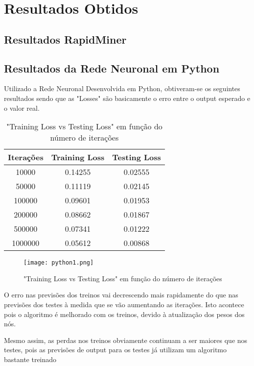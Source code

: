 \documentclass[conference]{IEEEtran}
\begin{document}
\section{Resultados Obtidos}
\subsection{Resultados RapidMiner}


\subsection{Resultados da Rede Neuronal em Python}

Utilizado a Rede Neuronal Desenvolvida em Python, obtiveram-se os seguintes resultados sendo que as "Losses" são basicamente o erro entre o output esperado e o valor real.

\begin{table}[htbp]
\caption{"Training Loss vs Testing Loss" em função do número de iterações}
\begin{center}
\begin{tabular}{|c|c|c|}
\hline
\textbf{Iterações} & \textbf{Training Loss} & \textbf{Testing Loss} \\
\hline
 10000 & 0.14255 & 0.02555\\
 50000 & 0.11119 & 0.02145\\
 100000 & 0.09601 & 0.01953\\
 200000 & 0.08662 & 0.01867\\
 500000 & 0.07341 & 0.01222\\
 1000000 & 0.05612 & 0.00868\\
\hline


\end{tabular}
\label{tab1}
\end{center}
\end{table}


\begin{figure}[H]
	\centering
	\texttt{[image: python1.png]}
	\caption{"Training Loss vs Testing Loss" em função do número de iterações}
	\label{fig:python1}
\end{figure}


O erro nas previsões dos treinos vai decrescendo mais rapidamente do que nas previsões dos testes à medida que se vão aumentando as iterações.
Isto acontece pois o algoritmo é melhorado com os treinos, devido à atualização dos pesos dos nós.

Mesmo assim, as perdas nos treinos obviamente continuam a ser maiores que nos testes, pois as previsões de output para os testes já utilizam um algoritmo bastante treinado
\end{document}
